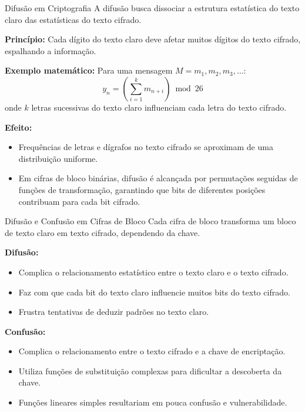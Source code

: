 \begin{frame}{Difusão em Criptografia}
    A difusão busca dissociar a estrutura estatística do texto claro das estatísticas do texto cifrado.

    \medskip
    \textbf{Princípio:} Cada dígito do texto claro deve afetar muitos dígitos do texto cifrado, espalhando a informação.

    \medskip
    \textbf{Exemplo matemático:} Para uma mensagem $M = m_1, m_2, m_3, \dots$:
    \[
        y_n = \left( \sum_{i=1}^{k} m_{n+i} \right) \bmod 26
    \]
    onde $k$ letras sucessivas do texto claro influenciam cada letra do texto cifrado.

    \medskip
    \textbf{Efeito:}
    \begin{itemize}
        \item Frequências de letras e dígrafos no texto cifrado se aproximam de uma distribuição uniforme.
        \item Em cifras de bloco binárias, difusão é alcançada por permutações seguidas de funções de transformação, garantindo que bits de diferentes posições contribuam para cada bit cifrado.
    \end{itemize}
\end{frame}

\begin{frame}{Difusão e Confusão em Cifras de Bloco}
    Cada cifra de bloco transforma um bloco de texto claro em texto cifrado, dependendo da chave.

    \medskip
    \textbf{Difusão:}
    \begin{itemize}
        \item Complica o relacionamento estatístico entre o texto claro e o texto cifrado.
        \item Faz com que cada bit do texto claro influencie muitos bits do texto cifrado.
        \item Frustra tentativas de deduzir padrões no texto claro.
    \end{itemize}

    \medskip
    \textbf{Confusão:}
    \begin{itemize}
        \item Complica o relacionamento entre o texto cifrado e a chave de encriptação.
        \item Utiliza funções de substituição complexas para dificultar a descoberta da chave.
        \item Funções lineares simples resultariam em pouca confusão e vulnerabilidade.
    \end{itemize}
\end{frame}

